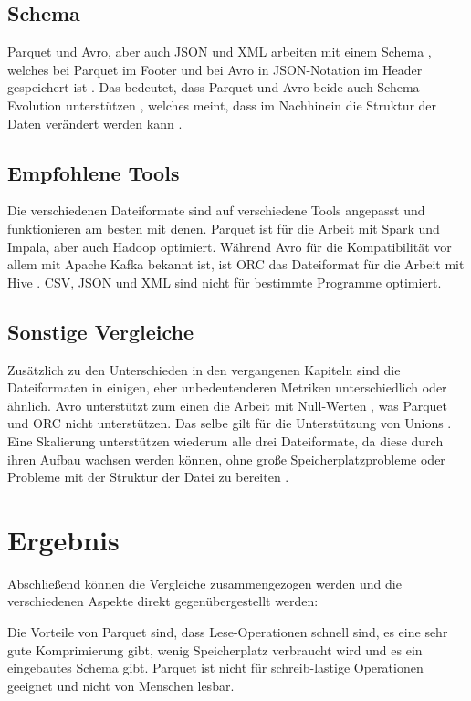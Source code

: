 \section{Schema}
Parquet und Avro, aber auch JSON und XML arbeiten mit einem Schema \cite[S. 268]{plase_comparison_2017}, welches bei Parquet im Footer und bei Avro in JSON-Notation im Header gespeichert ist \cite[S. 337ff.]{munir_cost-based_2020}. Das bedeutet, dass Parquet und Avro beide auch Schema-Evolution unterstützen \cite[S. 553]{belov_analysis_2021}, welches meint, dass im Nachhinein die Struktur der Daten verändert werden kann \cite[S. 1ff.]{delplanque_relational_2018}.

\section{Empfohlene Tools}
Die verschiedenen Dateiformate sind auf verschiedene Tools angepasst und funktionieren am besten mit denen. Parquet ist für die Arbeit mit Spark und Impala, aber auch Hadoop optimiert. Während Avro für die Kompatibilität vor allem mit Apache Kafka bekannt ist, ist ORC das Dateiformat für die Arbeit mit Hive \cite[S. 907]{gohil_compendious_2022}. CSV, JSON und XML sind nicht für bestimmte Programme optimiert.

\section{Sonstige Vergleiche}
Zusätzlich zu den Unterschieden in den vergangenen Kapiteln sind die Dateiformaten in einigen, eher unbedeutenderen Metriken unterschiedlich oder ähnlich. Avro unterstützt zum einen die Arbeit mit Null-Werten \cite{apache_avro_nodate}, was Parquet und ORC nicht unterstützen. Das selbe gilt für die Unterstützung von Unions \cite{apache_avro_nodate}. Eine Skalierung unterstützen wiederum alle drei Dateiformate, da diese durch ihren Aufbau wachsen werden können, ohne große Speicherplatzprobleme oder Probleme mit der Struktur der Datei zu bereiten \cite[S. 337ff.]{munir_cost-based_2020}. 

\chapter{Ergebnis}
Abschließend können die Vergleiche zusammengezogen werden und die verschiedenen Aspekte direkt gegenübergestellt werden:

Die Vorteile von Parquet sind, dass Lese-Operationen schnell sind, es eine sehr gute Komprimierung gibt, wenig Speicherplatz verbraucht wird und es ein eingebautes Schema gibt. Parquet ist nicht für schreib-lastige Operationen geeignet und nicht von Menschen lesbar. 

